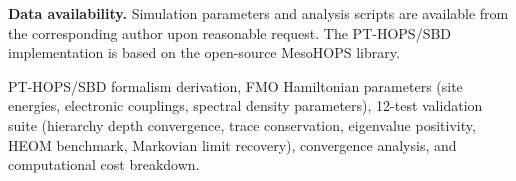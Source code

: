 \documentclass[journal=jpcl,manuscript=letter]{achemso}
\begin{document}
\textbf{Data availability.} Simulation parameters and analysis scripts are available from the corresponding author upon reasonable request. The PT-HOPS/SBD implementation is based on the open-source MesoHOPS library.


\begin{suppinfo}
PT-HOPS/SBD formalism derivation, FMO Hamiltonian parameters (site energies, electronic couplings, spectral density parameters), 12-test validation suite (hierarchy depth convergence, trace conservation, eigenvalue positivity, HEOM benchmark, Markovian limit recovery), convergence analysis, and computational cost breakdown.
\end{suppinfo}



\end{document}
